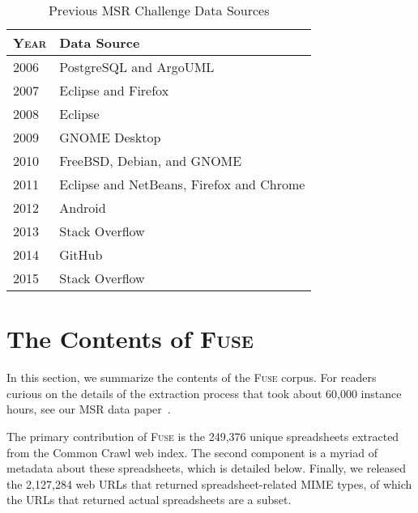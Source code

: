 \documentclass[conference]{IEEEtran}
\newcommand{\urlcount}{2,127,284}
\newcommand{\xlscount}{249,376}
\begin{document}

\begin{table}[!t]
\caption{Previous MSR Challenge Data Sources\label{tab:datasources}}
\centering
\begin{tabular}{ll}
\toprule
\textbf{\textsc{Year}} & \textbf{Data Source}\\
\midrule
2006 & PostgreSQL and ArgoUML\\
2007 & Eclipse and Firefox\\
2008 & Eclipse\\
2009 & GNOME Desktop\\
2010 & FreeBSD, Debian, and GNOME\\
2011 & Eclipse and NetBeans, Firefox and Chrome\\
2012 & Android\\
2013 & Stack Overflow\\
2014 & GitHub\\
2015 & Stack Overflow\\
\bottomrule
\end{tabular}
\end{table}



\section{The Contents of \textsc{Fuse}}

In this section, we summarize the contents of the \textsc{Fuse} corpus.
For readers curious on the details of the extraction process that took about 60,000 instance hours, see our MSR data paper~\cite{barik2015}.

The primary contribution of \textsc{Fuse} is the \xlscount{} unique spreadsheets extracted from the Common Crawl web index.
The second component is a myriad of metadata about these spreadsheets, which is detailed below.
Finally, we released the \urlcount{} web URLs that returned spreadsheet-related MIME types, of which the URLs that returned actual spreadsheets are a subset.
\end{document}
